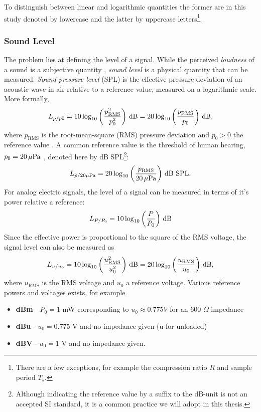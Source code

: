 \documentclass[../main2.tex]{subfiles}
\begin{document}
To distinguish between linear and logarithmic quantities the former are in this study denoted by lowercase and the latter by uppercase letters\footnote{There are a few exceptions, for example the compression ratio $R$ and sample period $T_s$.}.
\subsubsection{Sound Level}
The problem lies at defining the level of a signal. While the perceived \emph{loudness} of a sound is a subjective quantity \cite{american1973american}, \emph{sound level} is a physical quantity that can be measured. \emph{Sound pressure level} (SPL) is the effective pressure deviation of an acoustic wave in air relative to a reference value, measured on a logarithmic scale. More formally,
\begin{equation}
L_{p/p0} = 10 \log_{10} \left( \frac{p_\text{RMS}^2}{p_0^2} \right) \mskip3mu\text{dB} = 20 \log_{10} \left( \frac{p_\text{RMS}}{p_0} \right) \mskip3mu\text{dB},
\end{equation}
where $p_\text{RMS}$ is the root-mean-square (RMS) pressure deviation and $p_0 > 0$ the reference value \cite{XXXXX}. A common reference value is the threshold of human hearing, $p_0 = 20 \mskip3mu\mu\text{Pa}$ \cite{XXXX}, denoted here by dB SPL\footnote{Although indicating the reference value by a suffix to the dB-unit is not an accepted SI standard, it is a common practice we will adopt in this thesis.}:
\begin{equation}
L_{p/20 \mu\text{Pa}} = 20 \log_{10} \left( \frac{p_\text{RMS}}{20 \mskip3mu\mu\text{Pa}} \right) \mskip3mu\text{dB SPL}.
\end{equation}
For analog electric signals, the level of a signal can be measured in terms of it's power relative a reference:
\begin{equation}
L_{P/P_0} = 10 \log_{10} \left( \frac{P}{P_0} \right) \mskip3mu\text{dB}
\end{equation}
Since the effective power is proportional to the square of the RMS voltage, the signal level can also be measured as
\begin{equation}
L_{u/u_0} = 10 \log_{10} \left( \frac{u_\text{RMS}^2}{u_0^2} \right) \mskip3mu\text{dB} = 20 \log_{10} \left( \frac{u_\text{RMS}}{u_0} \right) \mskip3mu\text{dB},
\end{equation}
where $u_\text{RMS}$ is the RMS voltage and $u_0$ a reference voltage. Various reference powers and voltages exists, for example 
\begin{itemize}
\item \textbf{dBm} - $P_0 = 1$ mW corresponding to $u_0 \approx 0.775 V$ for an 600 $\Omega$ impedance
\item \textbf{dBu} - $u_0 = 0.775$ V and no impedance given (u for unloaded)
\item \textbf{dBV} - $u_0 = 1$ V and no impedance given.
\end{itemize}
\end{document}
